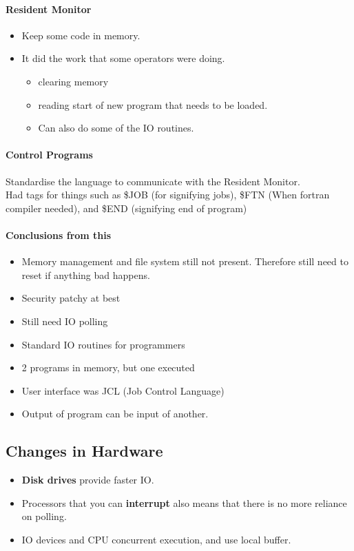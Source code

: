 \documentclass{article}
\newcommand\tab[1][0.5cm]{\hspace*{#1}}
\begin{document}
		\paragraph{\tab Resident Monitor}
		\begin{itemize}
			\item Keep some code in memory.
			\item It did the work that some operators were doing.
			\begin{itemize}
				\item clearing memory
				\item reading start of new program that needs to be loaded.
				\item Can also do some of the IO routines.
			\end{itemize}
		\end{itemize}

		\paragraph{\tab Control Programs}
		Standardise the language to communicate with the Resident Monitor.
		\\ Had tags for things such as \$JOB (for signifying jobs), \$FTN (When fortran compiler needed), and \$END (signifying end of program)

		\paragraph{Conclusions from this}
		\begin{itemize}
			\item Memory management and file system still not present. Therefore still need to reset if anything bad happens.
			\item Security patchy at best
			\item Still need IO polling
			\item Standard IO routines for programmers
			\item 2 programs in memory, but one executed
			\item User interface was JCL (Job Control Language)
			\item Output of program can be input of another.
		\end{itemize}

	\subsection{Changes in Hardware}
		\begin{itemize}
			\item\textbf{Disk drives} provide faster IO.
			\item Processors that you can \textbf{interrupt} also means that there is no more reliance on polling.
			\item IO devices and CPU concurrent execution, and use local buffer.
		\end{itemize}
\end{document}

